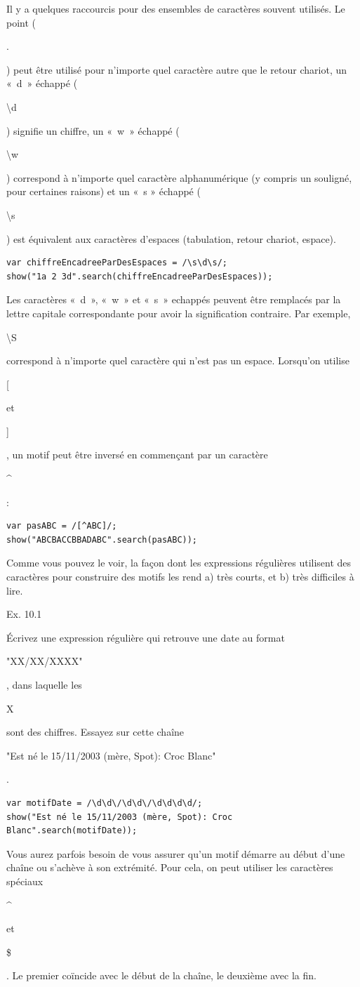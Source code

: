 \documentclass{FramateX}
\renewcommand{\texttt}[1]{\begin{sffamily}{#1}\end{sffamily}}
\begin{document}
\begin{center}\end{center}

Il y a quelques raccourcis pour des ensembles de caractères souvent
utilisés. Le point (\texttt{.}) peut être utilisé pour n'importe quel
caractère autre que le retour chariot, un «~d~» échappé
(\texttt{\textbackslash{}d}) signifie un chiffre, un «~w~» échappé
(\texttt{\textbackslash{}w}) correspond à n'importe quel caractère
alphanumérique (y compris un souligné, pour certaines raisons) et un «~s
» échappé (\texttt{\textbackslash{}s}) est équivalent aux caractères
d'espaces (tabulation, retour chariot, espace).

\begin{lstlisting}
var chiffreEncadreeParDesEspaces = /\s\d\s/;
show("1a 2 3d".search(chiffreEncadreeParDesEspaces));
\end{lstlisting}
Les caractères «~d~», «~w~» et «~s~» echappés peuvent être remplacés par
la lettre capitale correspondante pour avoir la signification contraire.
Par exemple, \texttt{\textbackslash{}S} correspond à n'importe quel
caractère qui n'est pas un espace. Lorsqu'on utilise \texttt{{[}} et
\texttt{{]}}, un motif peut être inversé en commençant par un caractère
\texttt{\^{}} :

\begin{lstlisting}
var pasABC = /[^ABC]/;
show("ABCBACCBBADABC".search(pasABC));
\end{lstlisting}
Comme vous pouvez le voir, la façon dont les expressions régulières
utilisent des caractères pour construire des motifs les rend a) très
courts, et b) très difficiles à lire.

\begin{center}\end{center}

Ex. 10.1

Écrivez une expression régulière qui retrouve une date au format
\texttt{"XX/XX/XXXX"}, dans laquelle les \texttt{X} sont des chiffres.
Essayez sur cette chaîne
\texttt{"Est né le 15/11/2003 (mère, Spot): Croc Blanc"}.

\begin{lstlisting}
var motifDate = /\d\d\/\d\d\/\d\d\d\d/;
show("Est né le 15/11/2003 (mère, Spot): Croc Blanc".search(motifDate));
\end{lstlisting}
\begin{center}\end{center}

Vous aurez parfois besoin de vous assurer qu'un motif démarre au début
d'une chaîne ou s'achève à son extrémité. Pour cela, on peut utiliser
les caractères spéciaux \texttt{\^{}} et \texttt{\$}. Le premier
coïncide avec le début de la chaîne, le deuxième avec la fin.
\end{document}
